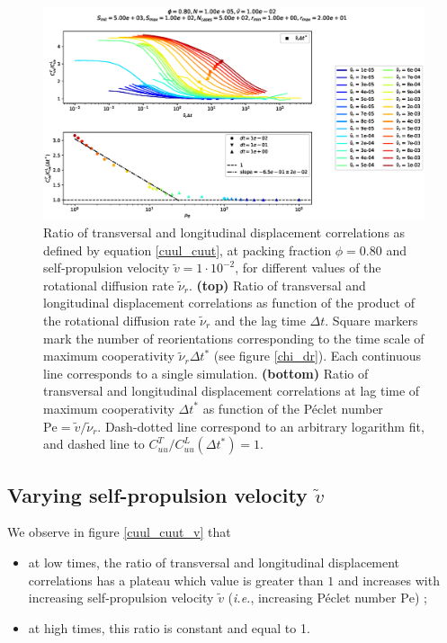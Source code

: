 \documentclass[class=report, float=false, crop=false]{standalone}
\begin{document}
\begin{figure}[h!]
\centering
\includegraphics[width=\textwidth]{figures/figs/CuuLCuuT_Dk8000_Vj1000_Nq1000_Io5000_Mn1000_Cn5000.eps}
\caption{Ratio of transversal and longitudinal displacement correlations as defined by equation \ref{cuul_cuut}, at packing fraction $\phi=0.80$ and self-propulsion velocity $\tilde{v}=1\cdot10^{-2}$, for different values of the rotational diffusion rate $\tilde{\nu}_r$. \textbf{(top)} Ratio of transversal and longitudinal displacement correlations as function of the product of the rotational diffusion rate $\tilde{\nu}_r$ and the lag time $\Delta t$. Square markers mark the number of reorientations corresponding to the time scale of maximum cooperativity $\tilde{\nu}_r \Delta t^*$ (see figure \ref{chi_dr}). Each continuous line corresponds to a single simulation. \textbf{(bottom)} Ratio of transversal and longitudinal displacement correlations at lag time of maximum cooperativity $\Delta t^*$ as function of the P\'eclet number $\text{Pe}=\tilde{v}/\tilde{\nu}_r$. Dash-dotted line correspond to an arbitrary logarithm fit, and dashed line to $C_{uu}^T/C_{uu}^L(\Delta t^*) = 1$.}
\label{cuul_cuut_dr}
\end{figure}

\subsection{Varying self-propulsion velocity $\tilde{v}$}

We observe in figure \ref{cuul_cuut_v} that
\begin{itemize}
  \item at low times, the ratio of transversal and longitudinal displacement correlations has a plateau which value is greater than $1$ and increases with increasing self-propulsion velocity $\tilde{v}$ (\textit{i.e.}, increasing P\'eclet number $\text{Pe}$) ;
  \item at high times, this ratio is constant and equal to 1.\\
\end{itemize}
\end{document}
